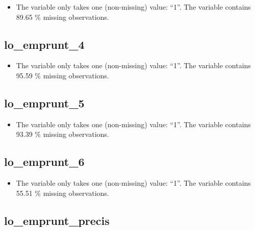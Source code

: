 \documentclass[
  letterpaper,
  DIV=11,
  numbers=noendperiod]{scrartcl}
\providecommand{\tightlist}{%
  \setlength{\itemsep}{0pt}\setlength{\parskip}{0pt}}
\begin{document}
\begin{itemize}
\tightlist
\item
  The variable only takes one (non-missing) value: ``1''. The variable
  contains 89.65 \% missing observations.
\end{itemize}

\fullline

\subsection{lo\_emprunt\_4}\label{lo_emprunt_4}

\begin{itemize}
\tightlist
\item
  The variable only takes one (non-missing) value: ``1''. The variable
  contains 95.59 \% missing observations.
\end{itemize}

\fullline

\subsection{lo\_emprunt\_5}\label{lo_emprunt_5}

\begin{itemize}
\tightlist
\item
  The variable only takes one (non-missing) value: ``1''. The variable
  contains 93.39 \% missing observations.
\end{itemize}

\fullline

\subsection{lo\_emprunt\_6}\label{lo_emprunt_6}

\begin{itemize}
\tightlist
\item
  The variable only takes one (non-missing) value: ``1''. The variable
  contains 55.51 \% missing observations.
\end{itemize}

\fullline

\subsection{lo\_emprunt\_precis}\label{lo_emprunt_precis}

\bminione
\end{document}
